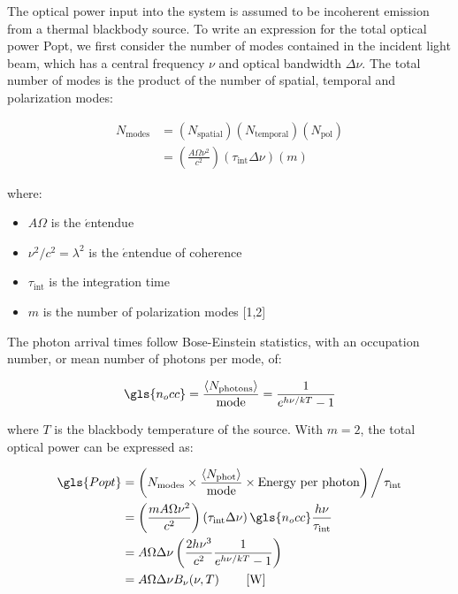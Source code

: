 The optical power input into the system is assumed to be incoherent emission from a thermal blackbody source. To write an expression for the total optical power \gls{Popt}, we first consider the number of modes contained in the incident light beam, which has a central frequency $\nu$ and optical bandwidth $\Delta \nu$. The total number of modes is the product of the number of spatial, temporal and polarization modes:

\begin{equation}
 \begin{aligned}
  N_{\mathrm{modes}} &= \left( N_{\mathrm{spatial}} \right) \left( N_{\mathrm{temporal}} \right) \left( N_{\mathrm{pol}} \right) \\
            &= \left( \frac{A\Omega\nu^{2}}{c^{2}} \right) \left(\tau_{\mathrm{int}}\Delta \nu \right) \left(m\right)
  \end{aligned}
\end{equation}

where:
\begin{itemize}[label={},nosep]
  \item $A\Omega$ is the $\acute{e}$ntendue
  \item $\nu^{2}/c^{2} = \lambda^{2}$ is the $\acute{e}$ntendue of coherence
  \item $\tau_{\mathrm{int}}$ is the integration time
  \item $m$ is the number of polarization modes [1,2]
\end{itemize}

The photon arrival times follow Bose-Einstein statistics, with an occupation number, or mean number of photons per mode, of:

\begin{equation}
  \gls{n_occ} = \frac{\left< N_{\mathrm{photons}} \right> }{\mathrm{mode}} = \frac{1}{e^{h\nu/kT} - 1}
\end{equation}

where $T$ is the blackbody temperature of the source. With $m = 2$, the total optical power can be expressed as:

\begin{equation}\label{eq:P_opt}
 \begin{aligned}
  \gls{Popt} &= \left( N_{\mathrm{modes}} \times \frac{\left< N_{\mathrm{phot}} \right>}{\mathrm{mode}} \times \textrm{Energy per photon} \right) \bigg/ \tau_{\mathrm{int}} \\
          &= \left( \frac{m A\Omega\nu^{2}}{c^{2}} \right) \left(\tau_{\mathrm{int}}\Delta \nu \right)  \gls{n_occ} \frac{h\nu}{\tau_{\mathrm{int}}} \\
          &= A\Omega\Delta\nu \left( \frac{2h\nu^{3}}{c^{2}}\frac{1}{e^{h\nu/kT} - 1} \right) \\
          &= A\Omega\Delta\nu B_{\nu}(\nu, T) \qquad \left[ \mathrm{W} \right]
  \end{aligned}
\end{equation}

